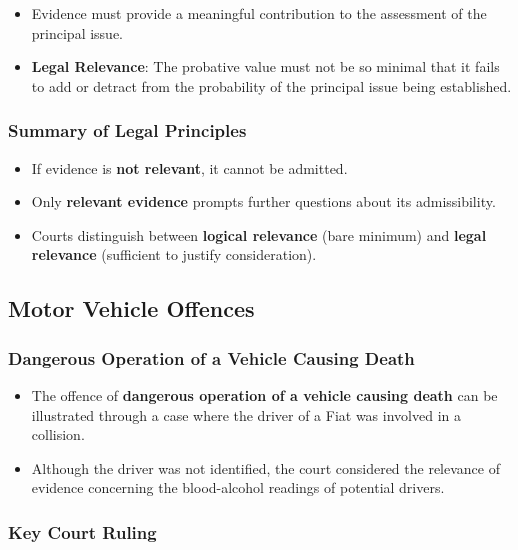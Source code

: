 \begin{itemize}
\tightlist
\item
  Evidence must provide a meaningful contribution to the assessment of
  the principal issue.
\item
  \textbf{Legal Relevance}: The probative value must not be so minimal
  that it fails to add or detract from the probability of the principal
  issue being established.
\end{itemize}

\subsubsection{Summary of Legal
Principles}\label{summary-of-legal-principles}

\begin{itemize}
\tightlist
\item
  If evidence is \textbf{not relevant}, it cannot be admitted.
\item
  Only \textbf{relevant evidence} prompts further questions about its
  admissibility.
\item
  Courts distinguish between \textbf{logical relevance} (bare minimum)
  and \textbf{legal relevance} (sufficient to justify consideration).
\end{itemize}

\subsection{  Motor Vehicle Offences}\label{motor-vehicle-offences}

\subsubsection{Dangerous Operation of a Vehicle Causing
Death}\label{dangerous-operation-of-a-vehicle-causing-death}

\begin{itemize}
\tightlist
\item
  The offence of \textbf{dangerous operation of a vehicle causing death}
  can be illustrated through a case where the driver of a Fiat was
  involved in a collision.
\item
  Although the driver was not identified, the court considered the
  relevance of evidence concerning the blood-alcohol readings of
  potential drivers.
\end{itemize}

\subsubsection{Key Court Ruling}\label{key-court-ruling}

